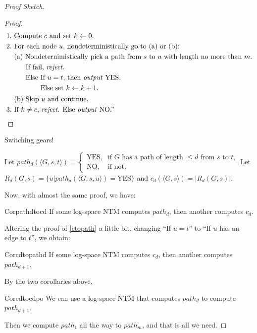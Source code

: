 \begin{proof}[Proof Sketch]
\begin{proof}
\begin{align*}
      1.   & \text{ Compute }c\text{ and set }k\leftarrow0.                                             \\
      2.   & \text{ For each node $u$, nondeterministically go to (a) or (b):}                          \\
           & \text{ (a) Nondeternimistically pick a path from $s$ to $u$ with length no more than $m$.} \\
           & \quad\quad\text{If fail, \textit{reject}.}                                                 \\
           & \quad\quad\text{Else }  \begin{aligned}[t]
                                        & \text{If $u=t$, then \textit{output} YES.} \\
                                        & \text{Else set }k\leftarrow k+1.
                                     \end{aligned}              \\
           & \text{ (b) Skip $u$ and continue.}                                                         \\
      3.   & \text{ If $k\neq c$, \textit{reject}. Else \textit{output} NO.''}\qedhere
    \end{align*}
  \end{proof}
  Switching gears!

  Let $path_d(\langle G,s,t\rangle)=\begin{cases}\text{YES,}&\text{if $G$ has a path of length $\leq d$ from $s$ to $t$,}\\ \text{NO,}&\text{if not.}\end{cases}$\newline
  Let $R_d(G,s)=\{u|path_d(\langle G,s,u\rangle)=\text{YES}\}$ and $c_d(\langle G,s\rangle)=|R_d(G,s)|$.

  Now, with almost the same proof, we have:
  \begin{reference}{Cor}{pathdtocd}
    If some log-space NTM computes $path_d$, then another computes $c_d$.
  \end{reference}
  Altering the proof of \ref{ctopath} a little bit, changing ``If $u=t$'' to ``If $u$ has an edge to $t$'', we obtain:
  \begin{reference}{Cor}{cdtopathd}
    If some log-space NTM computes $c_d$, then another computes $path_{d+1}$.
  \end{reference}
  By the two corollaries above,
  \begin{reference}{Cor}{cdtocdpo}
    We can use a log-space NTM that computes $path_d$ to compute $path_{d+1}$.
  \end{reference}
  Then we compute $path_1$ all the way to $path_m$, and that is all we need.
\end{proof}

